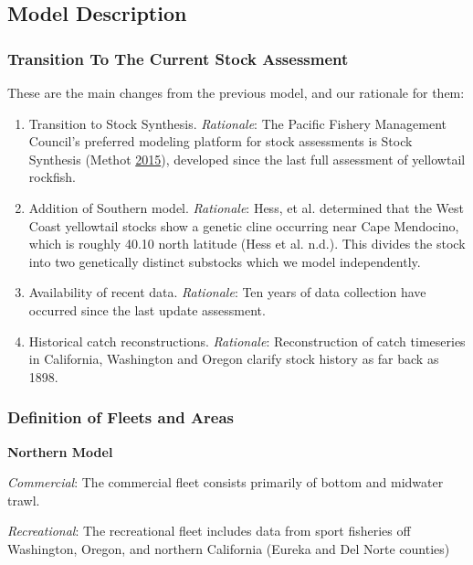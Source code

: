 \documentclass[12pt,]{article}
\begin{document}
\subsection{Model Description}\label{model-description}

\subsubsection{Transition To The Current Stock
Assessment}\label{transition-to-the-current-stock-assessment}

These are the main changes from the previous model, and our rationale
for them:

\begin{enumerate}
\def\labelenumi{\arabic{enumi}.}
\item
  Transition to Stock Synthesis. \emph{Rationale}: The Pacific Fishery
  Management Council's preferred modeling platform for stock assessments
  is Stock Synthesis (Methot \protect\hyperlink{ref-Methot2015}{2015}),
  developed since the last full assessment of yellowtail rockfish.
\item
  Addition of Southern model. \emph{Rationale}: Hess, et al. determined
  that the West Coast yellowtail stocks show a genetic cline occurring
  near Cape Mendocino, which is roughly 40.10 north latitude (Hess et
  al. n.d.). This divides the stock into two genetically distinct
  substocks which we model independently.
\item
  Availability of recent data. \emph{Rationale}: Ten years of data
  collection have occurred since the last update assessment.
\item
  Historical catch reconstructions. \emph{Rationale}: Reconstruction of
  catch timeseries in California, Washington and Oregon clarify stock
  history as far back as 1898.
\end{enumerate}

\subsubsection{Definition of Fleets and
Areas}\label{definition-of-fleets-and-areas}

\textbf{Northern Model}

\emph{Commercial}: The commercial fleet consists primarily of bottom and
midwater trawl.

\emph{Recreational}: The recreational fleet includes data from sport
fisheries off Washington, Oregon, and northern California (Eureka and
Del Norte counties)
\end{document}
